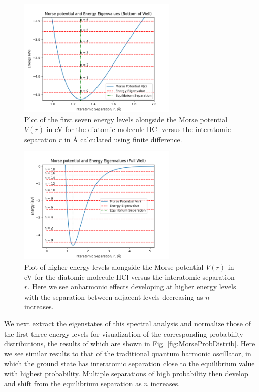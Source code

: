 \documentclass[%
aps, %
prl, %
preprint, %
12pt, %
amsfonts, %
amssymb, %
amsmath, %
endfloats,%
raggedbottom, %
]{revtex4-1}
\begin{document}
\begin{figure}
\centering
\includegraphics[width=0.67\textwidth]{lower_well_morse_energies.png}
\caption{\label{fig:MorseLowEnergies} Plot of the first seven energy levels alongside the Morse
potential $V(r)$ in eV for the diatomic molecule HCl versus the interatomic separation $r$ in Å
calculated using finite difference.}
\end{figure}

\begin{figure}
\centering
\includegraphics[width=0.67\textwidth]{full_morse_and_energies.png}
\caption{\label{fig:MorseFullSpectrum} Plot of higher energy levels alongside the Morse
potential $V(r)$ in eV for the diatomic molecule HCl versus the interatomic separation $r$. Here we see
anharmonic effects developing at higher energy levels with the separation between adjacent levels decreasing as
$n$ increases.}
\end{figure}

We next extract the eigenstates of this spectral analysis and normalize those of the first three energy
levels for visualization of the corresponding probability distributions, the results of which are shown
in Fig. \ref{fig:MorseProbDistrib}. Here we see similar results to that of the traditional quantum
harmonic oscillator, in which the ground state has interatomic separation close to the equilibrium value
with highest probability. Multiple separations of high probability then develop and shift from the
equilibrium separation as $n$ increases.
\end{document}
